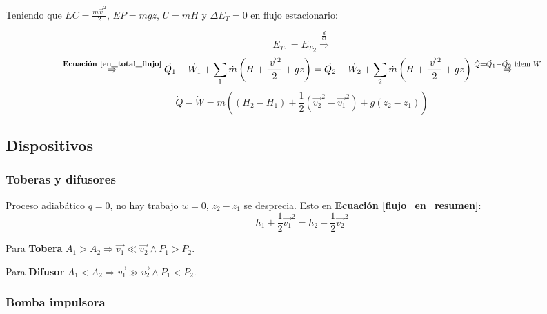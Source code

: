            
            Teniendo que \(EC = \frac{m\overrightarrow{v}^{2}}{2}\), \(EP = mgz\), \(U = mH\) y \(\Delta E_{T} = 0\) en flujo estacionario:
            
            \[{E_{T}}_{1} = {E_{T}}_{2} \overset{\frac{d}{dt}}{\Rightarrow}\]
            \[\overset{\text{\textbf{Ecuación \ref{en_total_flujo}}}}{\Rightarrow} \dot{Q_{1}} - \dot{W_{1}} + \sum_{1} \dot{m} \left ( H + \frac{\overrightarrow{v}^{2}}{2} + gz \right ) = \dot{Q_{2}} - \dot{W_{2}} + \sum_{2} \dot{m} \left ( H + \frac{\overrightarrow{v}^{2}}{2} + gz \right ) \overset{\dot{Q} = \dot{Q_{1}} - \dot{Q_{2}} \text{ idem } W}{\Rightarrow}\]
            \begin{equation}
            \label{flujo_en_resumen}
                \dot{Q} - \dot{W} = \dot{m} \left ( (H_{2}-H_{1}) + \frac{1}{2}\left ( \overrightarrow{v_{2}}^{2} - \overrightarrow{v_{1}}^{2} \right ) + g(z_{2} - z_{1}) \right )
            \end{equation}
    \newpage
    
    \subsection{Dispositivos}
    
        \subsubsection{Toberas y difusores}
        
        Proceso adiabático \(q=0\), no hay trabajo \(w=0\), \(z_{2} - z_{1}\) se desprecia. Esto en \textbf{Ecuación \ref{flujo_en_resumen}}:
        \[h_{1} + \frac{1}{2}\overrightarrow{v_{1}}^{2} = h_{2} + \frac{1}{2}\overrightarrow{v_{2}}^{2}\]
        
        Para \textbf{Tobera} \(A_{1} > A_{2} \Rightarrow \overrightarrow{v_{1}} \ll \overrightarrow{v_{2}} \wedge P_{1} > P_{2}\).
        
        Para \textbf{Difusor} \(A_{1} < A_{2} \Rightarrow \overrightarrow{v_{1}} \gg \overrightarrow{v_{2}} \wedge P_{1} < P_{2}\).
        
        \subsubsection{Bomba impulsora}
        
        \begin{quote}
            \textit{}
        \end{quote}
        
